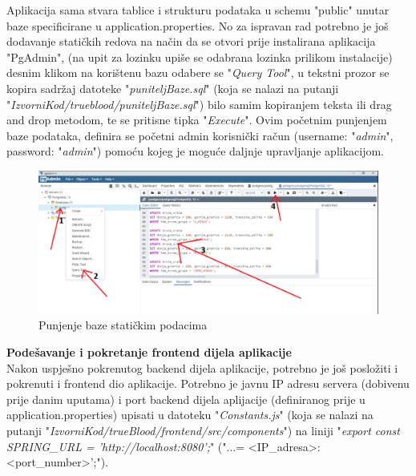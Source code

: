 			Aplikacija sama stvara tablice i strukturu podataka u schemu "public" unutar baze specificirane u application.properties. No za ispravan rad potrebno je još dodavanje statičkih redova na način da se otvori prije instalirana aplikacija "PgAdmin", (na upit za lozinku upiše se odabrana lozinka prilikom instalacije) desnim klikom na korištenu bazu odabere se "\textit{Query Tool}", u tekstni prozor se kopira sadržaj datoteke "\textit{puniteljBaze.sql}" (koja se nalazi na putanji "\textit{IzvorniKod/trueblood/puniteljBaze.sql}") bilo samim kopiranjem teksta ili drag and drop metodom, te se pritisne tipka "\textit{Execute}". Ovim početnim punjenjem baze podataka, definira se početni admin korisnički račun (username: "\textit{admin}", password: "\textit{admin}") pomoću kojeg je moguće daljnje upravljanje aplikacijom.
			
			\begin{figure}[H]
			\centering
			\includegraphics[width=\textwidth, scale=0.5]{slike/puniteljBaze}
			\caption{Punjenje baze statičkim podacima}
			\label{fig:puniteljBaze}
			\end{figure}
			
			\textbf{Podešavanje i pokretanje frontend dijela aplikacije}\\
			Nakon uspješno pokrenutog backend dijela aplikacije, potrebno je još posložiti i pokrenuti i frontend dio aplikacije. Potrebno je javnu IP adresu servera (dobivenu prije danim uputama) i port backend dijela aplijacije (definiranog prije u application.properties) upisati u datoteku "\textit{Constants.js}" (koja se nalazi na putanji "\textit{IzvorniKod/trueBlood/frontend/src/components}") na liniji "\textit{export const SPRING_URL = 'http://localhost:8080';}" ("...= <IP_adresa>:<port_number>';").


